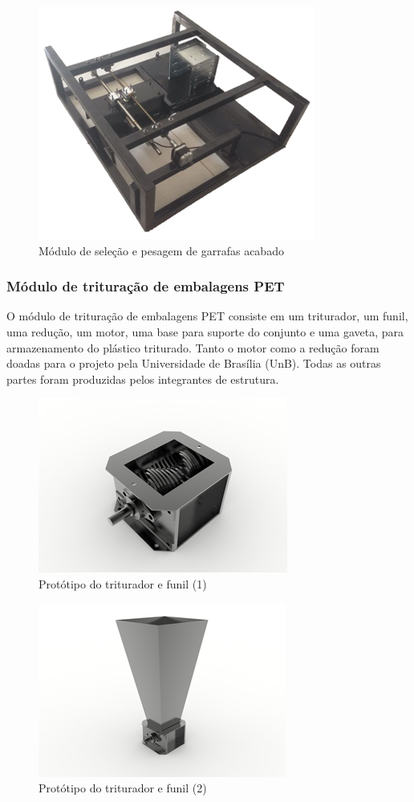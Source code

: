 \begin{figure}[!h]
	\centering
		\includegraphics[scale=0.8]{figuras/estrutura/12.png}
	\caption{Módulo de seleção e pesagem de garrafas acabado}
\end{figure}

\subsubsection{Módulo de trituração de embalagens PET}
O módulo de trituração de embalagens PET consiste em um triturador, um funil, uma redução, um motor, uma base para suporte do conjunto e uma gaveta, para armazenamento do plástico triturado. Tanto o motor como a redução foram doadas para o projeto pela Universidade de Brasília (UnB). Todas as outras partes foram produzidas pelos integrantes de estrutura.

\begin{figure}[!h]
	\centering
		\includegraphics[scale=0.7]{figuras/estrutura/13(1).png}
	\caption{Protótipo do triturador e funil (1)}
\end{figure}

\begin{figure}[!h]
	\centering
		\includegraphics[scale=0.7]{figuras/estrutura/13(2).png}
	\caption{Protótipo do triturador e funil (2)}
\end{figure}

